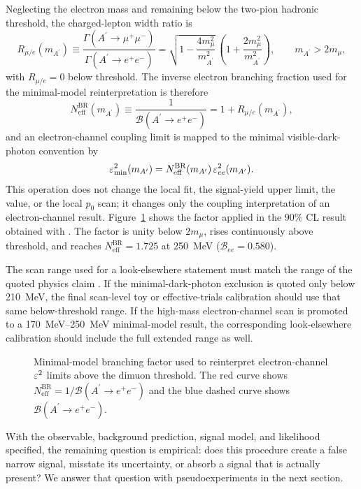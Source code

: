 Neglecting the electron mass and remaining below the two-pion hadronic threshold, the
charged-lepton width ratio is
\begin{equation}
R_{\mu/e}(m_{A^\prime})
\equiv
\frac{\Gamma(A^\prime\to\mu^+\mu^-)}
{\Gamma(A^\prime\to e^+e^-)}
=
\sqrt{1-\frac{4m_\mu^2}{m_{A^\prime}^2}}\,
\left(1+\frac{2m_\mu^2}{m_{A^\prime}^2}\right),
\qquad m_{A^\prime}>2m_\mu,
\label{eq:dimuon-width-ratio}
\end{equation}
with $R_{\mu/e}=0$ below threshold. The inverse electron branching fraction used for
the minimal-model reinterpretation is therefore
\begin{equation}
N_{\mathrm{eff}}^{\mathrm{BR}}(m_{A^\prime})
\equiv
\frac{1}{\mathcal{B}(A^\prime\to e^+e^-)}
=
1+R_{\mu/e}(m_{A^\prime}),
\label{eq:dimuon-neff}
\end{equation}
and an electron-channel coupling limit is mapped to the minimal visible-dark-photon
convention by
\begin{equation}
\varepsilon^2_{\mathrm{min}}(m_{A^\prime})
=
N_{\mathrm{eff}}^{\mathrm{BR}}(m_{A^\prime})\,\varepsilon^2_{ee}(m_{A^\prime}).
\label{eq:dimuon-eps2-map}
\end{equation}
This operation does not change the local fit, the signal-yield upper limit, the
\CLs{} value, or the local $p_0$ scan; it changes only the coupling interpretation of
an electron-channel result. Figure~\ref{fig:methodology-dimuon-factor} shows the
factor applied in the 90\% CL result obtained with \CLs{}. The factor is unity below
$2m_\mu$, rises continuously above threshold, and reaches
$N_{\mathrm{eff}}^{\mathrm{BR}}=1.725$ at \SI{250}{MeV}
($\mathcal{B}_{ee}=0.580$).

The scan range used for a look-elsewhere statement must match the range of the quoted
physics claim \cite{GrossVitells2010}. If the minimal-dark-photon exclusion is quoted
only below \SI{210}{MeV}, the final scan-level toy or effective-trials calibration
should use that same below-threshold range. If the high-mass electron-channel scan is
promoted to a \SIrange{170}{250}{MeV} minimal-model result, the corresponding
look-elsewhere calibration should include the full extended range as well.

\begin{figure}[H]
\centering
{}
\caption{Minimal-model branching factor used to reinterpret electron-channel
$\varepsilon^2$ limits above the dimuon threshold. The red curve shows
$N_{\mathrm{eff}}^{\mathrm{BR}}=1/\mathcal{B}(A^\prime\to e^+e^-)$ and the blue dashed
curve shows $\mathcal{B}(A^\prime\to e^+e^-)$.}
\label{fig:methodology-dimuon-factor}
\end{figure}

With the observable, background prediction, signal model, and likelihood specified,
the remaining question is empirical: does this procedure create a false narrow signal,
misstate its uncertainty, or absorb a signal that is actually present? We answer that
question with pseudoexperiments in the next section.
